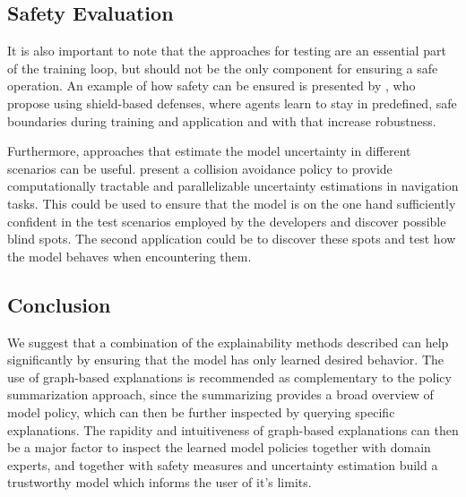 \documentclass[twoside,11pt]{article}
\begin{document}
\begin{enumerate}
\subsection{Safety Evaluation}
It is also important to note that the approaches for testing are an essential part of the training loop, but should not be the only component for ensuring a safe operation. An example of how safety can be ensured is presented by \citet{XiongEtAl:2020:Robustness}, who propose using shield-based defenses, where agents learn to stay in predefined, safe boundaries during training and application and with that increase robustness.

Furthermore, approaches that estimate the model uncertainty in different scenarios can be useful. \citet{LuetjensEverettHow:2018:RLModelUncertainty} present a collision avoidance policy to provide computationally tractable and parallelizable uncertainty estimations in navigation tasks. This could be used to ensure that the model is on the one hand sufficiently confident in the test scenarios employed by the developers and discover possible blind spots. The second application could be to discover these spots and test how the model behaves when encountering them.

\subsection{Conclusion}

We suggest that a combination of the explainability methods described can help significantly by ensuring that the model has only learned desired behavior. The use of graph-based explanations is recommended as complementary to the policy summarization approach, since the summarizing provides a broad overview of model policy, which can then be further inspected by querying specific explanations. The rapidity and intuitiveness of graph-based explanations can then be a major factor to inspect the learned model policies together with domain experts, and together with safety measures and uncertainty estimation build a trustworthy model which informs the user of it's limits.


\end{enumerate}
\end{document}
